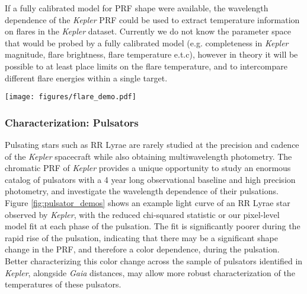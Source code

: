 \documentclass[iop]{emulateapj}
\newcommand{\kepler}{\emph{Kepler}\xspace}
\begin{document}
If a fully calibrated model for PRF shape were available, the wavelength dependence of the \kepler PRF could be used to extract temperature information on flares in the \kepler dataset. Currently we do not know the parameter space that would be probed by a fully calibrated model (e.g. completeness in \kepler magnitude, flare brightness, flare temperature e.t.c), however in theory it will be possible to at least place limits on the flare temperature, and to intercompare different flare energies within a single target.

\begin{figure*}
    \centering
    \texttt{[image: figures/flare\_demo.pdf]}
    \caption{Demonstration of how the model presented in this work can be used to indentify and characterize flares. Shown is flare star KIC 8093473. The SAP flux light curve is plotted, with the color bar shows the reduced chi squared statistic at each point for our model compared with the measured \kepler data, summed up over all pixels. Several flare shows a significant deviation from the model, indicating a shape change. This is expected, given that stellar flares peak at a high temperature compared with the photosphere, and so have a wavelength dependence.}
    \label{fig:flare_demo}
\end{figure*}


\subsubsection{Characterization: Pulsators}

Pulsating stars such as RR Lyrae are rarely studied at the precision and cadence of the \kepler spacecraft while also obtaining multiwavelength photometry. The chromatic PRF of \kepler provides a unique opportunity to study an enormous catalog of pulsators with a 4 year long observational baseline and high precision photometry, and investigate the wavelength dependence of their pulsations. Figure \ref{fig:pulsator_demos} shows an example light curve of an RR Lyrae star observed by \kepler, with the reduced chi-squared statistic or our pixel-level model fit at each phase of the pulsation. The fit is significantly poorer during the rapid rise of the pulsation, indicating that there may be a significant shape change in the PRF, and therefore a color dependence, during the pulsation. Better characterizing this color change across the sample of pulsators identified in \kepler, alongside \emph{Gaia} distances, may allow more robust characterization of the temperatures of these pulsators. 
\end{document}
